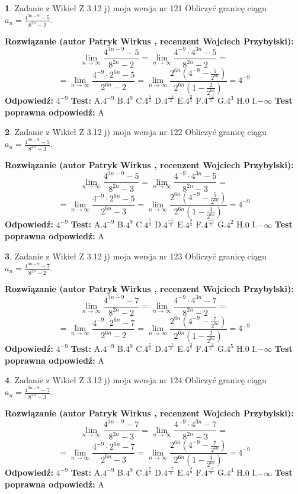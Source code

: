 \documentclass[12pt, a4paper]{article}
\theoremstyle{definition} %
\newtheorem{zad}{}
\newcommand{\zadStart}[1]{\begin{zad}#1\newline}
\newcommand{\zadStop}{\end{zad}}
\newcommand{\rozwStart}[2]{\noindent \textbf{Rozwiązanie (autor #1 , recenzent #2): }\newline}
\newcommand{\rozwStop}{\newline}
\newcommand{\odpStart}{\noindent \textbf{Odpowiedź:}\newline}
\newcommand{\odpStop}{\newline}
\newcommand{\testStart}{\noindent \textbf{Test:}\newline}
\newcommand{\testStop}{\newline}
\newcommand{\kluczStart}{\noindent \textbf{Test poprawna odpowiedź:}\newline}
\newcommand{\kluczStop}{\newline}
\begin{document}
\zadStart{Zadanie z Wikieł Z 3.12 j) moja wersja nr 121}
Obliczyć granicę ciągu $a_{n}=\frac{4^{3n-9}-5}{8^{2n}-2}$.
\zadStop
\rozwStart{Patryk Wirkus}{Wojciech Przybylski}
$$\lim\limits_{n\to\infty}\frac{4^{3n-9}-5}{8^{2n}-2}= \lim\limits_{n\to\infty}\frac{4^{-9} \cdot 4^{3n}-5}{8^{2n}-2}=$$
$$= \lim\limits_{n\to\infty}\frac{4^{-9} \cdot 2^{6n}-5}{2^{6n}-2}= \lim\limits_{n\to\infty}\frac{2^{6n}(4^{-9} - \frac{5}{2^{6n}})}{2^{6n}(1-\frac{2}{2^{6n}})}= 4^{-9}$$
\rozwStop
\odpStart
$4^{-9}$
\odpStop
\testStart
A.$4^{-9}$
B.$4^{9}$
C.$4^{\frac{5}{2}}$
D.$4^{\frac{-5}{2}}$
E.$4^{\frac{2}{5}}$
F.$4^{\frac{-2}{5}}$
G.$4^{3}$
H.$0$
I.$-\infty$
\testStop
\kluczStart
A
\kluczStop



\zadStart{Zadanie z Wikieł Z 3.12 j) moja wersja nr 122}
Obliczyć granicę ciągu $a_{n}=\frac{4^{3n-9}-5}{8^{2n}-3}$.
\zadStop
\rozwStart{Patryk Wirkus}{Wojciech Przybylski}
$$\lim\limits_{n\to\infty}\frac{4^{3n-9}-5}{8^{2n}-3}= \lim\limits_{n\to\infty}\frac{4^{-9} \cdot 4^{3n}-5}{8^{2n}-3}=$$
$$= \lim\limits_{n\to\infty}\frac{4^{-9} \cdot 2^{6n}-5}{2^{6n}-3}= \lim\limits_{n\to\infty}\frac{2^{6n}(4^{-9} - \frac{5}{2^{6n}})}{2^{6n}(1-\frac{3}{2^{6n}})}= 4^{-9}$$
\rozwStop
\odpStart
$4^{-9}$
\odpStop
\testStart
A.$4^{-9}$
B.$4^{9}$
C.$4^{\frac{5}{3}}$
D.$4^{\frac{-5}{3}}$
E.$4^{\frac{3}{5}}$
F.$4^{\frac{-3}{5}}$
G.$4^{2}$
H.$0$
I.$-\infty$
\testStop
\kluczStart
A
\kluczStop



\zadStart{Zadanie z Wikieł Z 3.12 j) moja wersja nr 123}
Obliczyć granicę ciągu $a_{n}=\frac{4^{3n-9}-7}{8^{2n}-2}$.
\zadStop
\rozwStart{Patryk Wirkus}{Wojciech Przybylski}
$$\lim\limits_{n\to\infty}\frac{4^{3n-9}-7}{8^{2n}-2}= \lim\limits_{n\to\infty}\frac{4^{-9} \cdot 4^{3n}-7}{8^{2n}-2}=$$
$$= \lim\limits_{n\to\infty}\frac{4^{-9} \cdot 2^{6n}-7}{2^{6n}-2}= \lim\limits_{n\to\infty}\frac{2^{6n}(4^{-9} - \frac{7}{2^{6n}})}{2^{6n}(1-\frac{2}{2^{6n}})}= 4^{-9}$$
\rozwStop
\odpStart
$4^{-9}$
\odpStop
\testStart
A.$4^{-9}$
B.$4^{9}$
C.$4^{\frac{7}{2}}$
D.$4^{\frac{-7}{2}}$
E.$4^{\frac{2}{7}}$
F.$4^{\frac{-2}{7}}$
G.$4^{5}$
H.$0$
I.$-\infty$
\testStop
\kluczStart
A
\kluczStop



\zadStart{Zadanie z Wikieł Z 3.12 j) moja wersja nr 124}
Obliczyć granicę ciągu $a_{n}=\frac{4^{3n-9}-7}{8^{2n}-3}$.
\zadStop
\rozwStart{Patryk Wirkus}{Wojciech Przybylski}
$$\lim\limits_{n\to\infty}\frac{4^{3n-9}-7}{8^{2n}-3}= \lim\limits_{n\to\infty}\frac{4^{-9} \cdot 4^{3n}-7}{8^{2n}-3}=$$
$$= \lim\limits_{n\to\infty}\frac{4^{-9} \cdot 2^{6n}-7}{2^{6n}-3}= \lim\limits_{n\to\infty}\frac{2^{6n}(4^{-9} - \frac{7}{2^{6n}})}{2^{6n}(1-\frac{3}{2^{6n}})}= 4^{-9}$$
\rozwStop
\odpStart
$4^{-9}$
\odpStop
\testStart
A.$4^{-9}$
B.$4^{9}$
C.$4^{\frac{7}{3}}$
D.$4^{\frac{-7}{3}}$
E.$4^{\frac{3}{7}}$
F.$4^{\frac{-3}{7}}$
G.$4^{4}$
H.$0$
I.$-\infty$
\testStop
\kluczStart
A
\kluczStop
\end{document}
